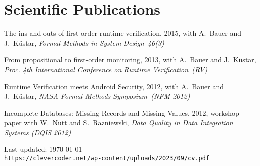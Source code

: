 \documentclass[letterpaper]{article}
\def\footerlink{https://clevercoder.net/wp-content/uploads/2023/09/cv.pdf}
\newenvironment{no-indent-itemize}{
  \begin{list}{}{
    \setlength{\leftmargin}{0em}
  }
}{
  \end{list}
}
\begin{document}
\section*{Scientific Publications}
\begin{no-indent-itemize}
  \item The ins and outs of first-order runtime verification, 2015, with A.~Bauer and J.~K\"{u}star, 
        {\it Formal Methods in System Design~46(3)}
  \item From propositional to first-order monitoring, 2013, with A.~Bauer and J.~K\"{u}star, 
        {\it Proc. 4th International Conference on Runtime Verification~(RV)}
  \item Runtime Verification meets Android Security, 2012, with A.~Bauer and J.~K\"{u}star, 
        {\it NASA Formal Methods Symposium~(NFM 2012)}
  \item Incomplete Databases: Missing Records and Missing Values, 2012, workshop paper with 
        W.~Nutt and S.~Razniewski, {\it Data Quality in Data Integration Systems (DQIS 2012)}
\end{no-indent-itemize}

\bigskip
\begin{center}
  \begin{footnotesize}
    Last updated: \today \\
    \href{\footerlink}{\texttt{\footerlink}}
  \end{footnotesize}
\end{center}
\end{document}

